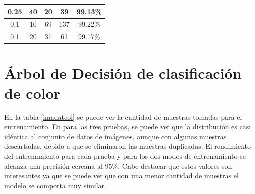 \documentclass[twoside,spanish,ESP,MSc]{plantillaLabUPV}
\theoremstyle{definition}
\begin{document}
\begin{table}[!tbh]
\begin{tabular}{|c|c|c|c|c|}
		0.25                                                                      & 40                                                                              & 20                                                                 & 39                                                                  & 99.13\%              \\ \hline
		0.1                                                                       & 10                                                                              & 69                                                                 & 137                                                                 & 99.22\%              \\ \hline
		0.1                                                                       & 20                                                                              & 31                                                                 & 61                                                                  & 99.17\%              \\ \hline
	\end{tabular}
\end{table}




\section{Árbol de Decisión de clasificación de color}

En la tabla \ref{imadatcol} se puede ver la cantidad de muestras tomadas para el entrenamiento. En para las tres pruebas, se puede ver que la distribución es casi idéntica al conjunto de datos de imágenes, aunque con algunas muestras descartadas, debido a que se eliminaron las muestras duplicadas. El rendimiento del entrenamiento para cada prueba y para los dos modos de entrenamiento se alcanza una precisión cercana al 95\%. Cabe destacar que estos valores son interesantes ya que se puede ver que con una menor cantidad de muestras el modelo se comporta muy similar.
\end{document}
